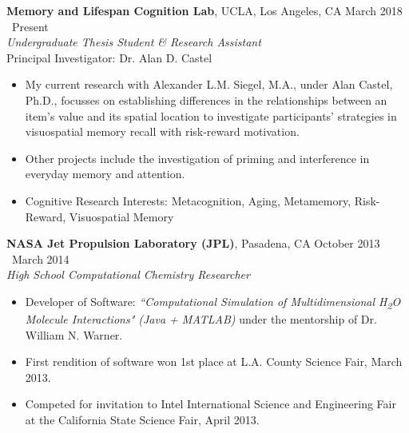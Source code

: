 \documentclass[margin]{res}
\begin{document}
\begin{resume}
		{\bf Memory and Lifespan Cognition Lab}, UCLA, Los Angeles, CA  \hfill March 2018 \textendash\ Present \\
		{\it Undergraduate Thesis Student \& Research Assistant} \\
		Principal Investigator: Dr. Alan D. Castel
		\begin{itemize} \itemsep -2pt
			\item My current research with Alexander L.M. Siegel, M.A., under Alan Castel, Ph.D., focusses on establishing differences in the relationships between an item's value and its spatial location to investigate participants' strategies in visuospatial memory recall with risk-reward motivation. 
			\item Other projects include the investigation of priming and interference in everyday memory and attention.
			\item Cognitive Research Interests: Metacognition, Aging, Metamemory, Risk-Reward, Visuospatial Memory
		\end{itemize}
		
		{\bf NASA Jet Propulsion Laboratory (JPL)}, Pasadena, CA \hfill October 2013 \textendash\ March 2014 \\
		{\it High School Computational Chemistry Researcher}
		\begin{itemize} \itemsep -2pt
			\item Developer of Software: {\it ``Computational Simulation of Multidimensional H\textsubscript{2}O Molecule Interactions" (Java + MATLAB)} under the mentorship of Dr. William N. Warner.
			\item First rendition of software won 1st place at L.A. County Science Fair, March 2013.
			\item Competed for invitation to Intel International Science and Engineering Fair at the California State Science Fair, April 2013.
		\end{itemize}
		

\end{resume}
\end{document}
